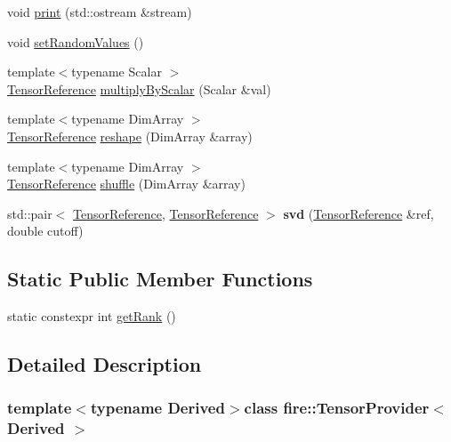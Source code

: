 \begin{DoxyCompactItemize}
\item 
void \hyperlink{a00047_afeb68ff9e9a371b44ea902ae26b9c132}{print} (std\+::ostream \&stream)
\item 
void \hyperlink{a00047_af882e5a36ddae95d1474435ae78b3f40}{set\+Random\+Values} ()
\item 
{\footnotesize template$<$typename Scalar $>$ }\\\hyperlink{a00103_a744d7805ef98562de55f32012ab11cfb}{Tensor\+Reference} \hyperlink{a00047_ad65a3028e102ab9ff8c3830c6c383519}{multiply\+By\+Scalar} (Scalar \&val)
\item 
{\footnotesize template$<$typename Dim\+Array $>$ }\\\hyperlink{a00103_a744d7805ef98562de55f32012ab11cfb}{Tensor\+Reference} \hyperlink{a00047_ad257556c65da4aef65153e46f80f2b4d}{reshape} (Dim\+Array \&array)
\item 
{\footnotesize template$<$typename Dim\+Array $>$ }\\\hyperlink{a00103_a744d7805ef98562de55f32012ab11cfb}{Tensor\+Reference} \hyperlink{a00047_a572796d05cb29fc28440357d4f206cb2}{shuffle} (Dim\+Array \&array)
\item 
\hypertarget{a00047_ab140c10e0fe23ce78ede63b66bce706a}{}std\+::pair$<$ \hyperlink{a00103_a744d7805ef98562de55f32012ab11cfb}{Tensor\+Reference}, \hyperlink{a00103_a744d7805ef98562de55f32012ab11cfb}{Tensor\+Reference} $>$ {\bfseries svd} (\hyperlink{a00103_a744d7805ef98562de55f32012ab11cfb}{Tensor\+Reference} \&ref, double cutoff)\label{a00047_ab140c10e0fe23ce78ede63b66bce706a}

\end{DoxyCompactItemize}
\subsection*{Static Public Member Functions}
\begin{DoxyCompactItemize}
\item 
static constexpr int \hyperlink{a00047_aed1bf408a6ead1bae3b5bd96cda2cfad}{get\+Rank} ()
\end{DoxyCompactItemize}


\subsection{Detailed Description}
\subsubsection*{template$<$typename Derived$>$class fire\+::\+Tensor\+Provider$<$ Derived $>$}

